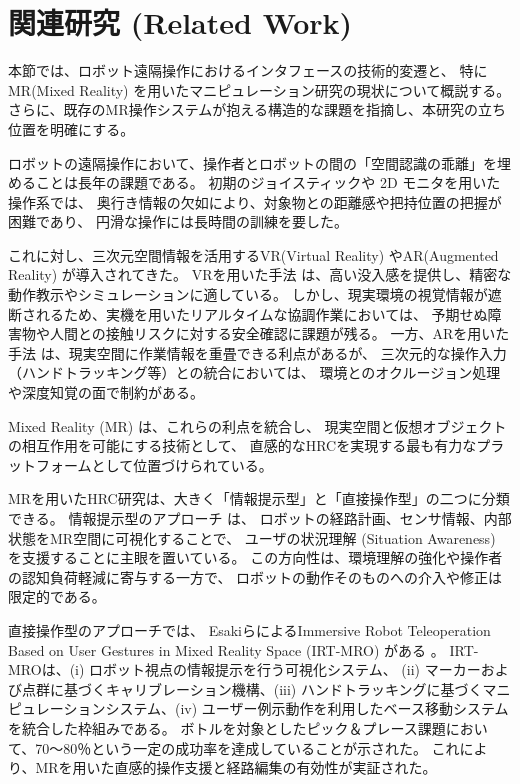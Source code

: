 \documentclass[../../main.tex]{subfiles} %
\begin{document}
\section{関連研究 (Related Work)}
本節では、ロボット遠隔操作におけるインタフェースの技術的変遷と、
特にMR(Mixed Reality) を用いたマニピュレーション研究の現状について概説する。
さらに、既存のMR操作システムが抱える構造的な課題を指摘し、本研究の立ち位置を明確にする。


ロボットの遠隔操作において、操作者とロボットの間の「空間認識の乖離」を埋めることは長年の課題である。
初期のジョイスティックや 2D モニタを用いた操作系では、
奥行き情報の欠如により、対象物との距離感や把持位置の把握が困難であり、
円滑な操作には長時間の訓練を要した\cite{teleop1}\cite{teleop2}。

これに対し、三次元空間情報を活用するVR(Virtual Reality) やAR(Augmented Reality) が導入されてきた。
VRを用いた手法 \cite{VR1}\cite{VR2}は、高い没入感を提供し、精密な動作教示やシミュレーションに適している。
しかし、現実環境の視覚情報が遮断されるため、実機を用いたリアルタイムな協調作業においては、
予期せぬ障害物や人間との接触リスクに対する安全確認に課題が残る。
一方、ARを用いた手法 \cite{AR1}\cite{AR2} は、現実空間に作業情報を重畳できる利点があるが、
三次元的な操作入力（ハンドトラッキング等）との統合においては、
環境とのオクルージョン処理や深度知覚の面で制約がある。

Mixed Reality (MR) は、これらの利点を統合し、
現実空間と仮想オブジェクトの相互作用を可能にする技術として、
直感的なHRCを実現する最も有力なプラットフォームとして位置づけられている\cite{MR1}\cite{MR2}\cite{MR3}\cite{MR4}\cite{MR5}。


MRを用いたHRC研究は、大きく「情報提示型」と「直接操作型」の二つに分類できる。
情報提示型のアプローチ\cite{Awareness} は、
ロボットの経路計画、センサ情報、内部状態をMR空間に可視化することで、
ユーザの状況理解 (Situation Awareness) を支援することに主眼を置いている。
この方向性は、環境理解の強化や操作者の認知負荷軽減に寄与する一方で、
ロボットの動作そのものへの介入や修正は限定的である。

直接操作型のアプローチでは、
EsakiらによるImmersive Robot Teleoperation Based on User Gestures in Mixed Reality Space (IRT-MRO) がある \cite{Esaki}。
IRT-MROは、(i) ロボット視点の情報提示を行う可視化システム、
(ii) マーカーおよび点群に基づくキャリブレーション機構、(iii) ハンドトラッキングに基づくマニピュレーションシステム、(iv) 
ユーザー例示動作を利用したベース移動システムを統合した枠組みである。
ボトルを対象としたピック＆プレース課題において、70〜80％という一定の成功率を達成していることが示された。
これにより、MRを用いた直感的操作支援と経路編集の有効性が実証された。
\end{document}
